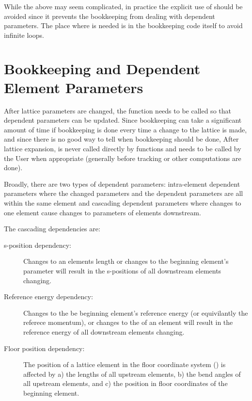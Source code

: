 While the above may seem complicated, in practice the explicit use of  should be avoided
since it prevents the bookkeeping from dealing with dependent parameters.
The place where  is needed is in the bookkeeping code itself to avoid infinite loops.
 

\section{Bookkeeping and Dependent Element Parameters}
\label{s:param.depend}

After lattice parameters are changed, the function  needs to be called
so that dependent parameters can be updated. 
Since bookkeeping can take a significant amount of time if bookkeeping is done every time
a change to the lattice is made, and since there is no good way to tell when bookkeeping should
be done, After lattice expansion,  is never called directly by \accellat 
functions and needs to be called by the User when appropriate (generally before tracking or
other computations are done).

Broadly, there are two types of dependent parameters: intra-element dependent parameters where
the changed parameters and the dependent parameters are all within the same element and
cascading dependent parameters where changes to one element cause changes to parameters of 
elements downstream.

The cascading dependencies are:
\begin{description}
%
\item [s-position dependency:]
Changes to an elements length  or changes to the beginning element's  parameter will
result in the s-positions of all downstream elements changing.
%
\item [Reference energy dependency:] Changes to the be beginning element's reference energy (or
equivilantly the referece momentum), or changes to the  of an  element
will result in the reference energy of all downstream elements changing.
%
\item[Floor position dependency:]
The position of a lattice element in the floor coordinate system () is affected
by a) the lengths of all upstream elements, b) the bend angles of all upstream elements, and c)
the position in floor coordinates of the beginning element.
\end{description}


